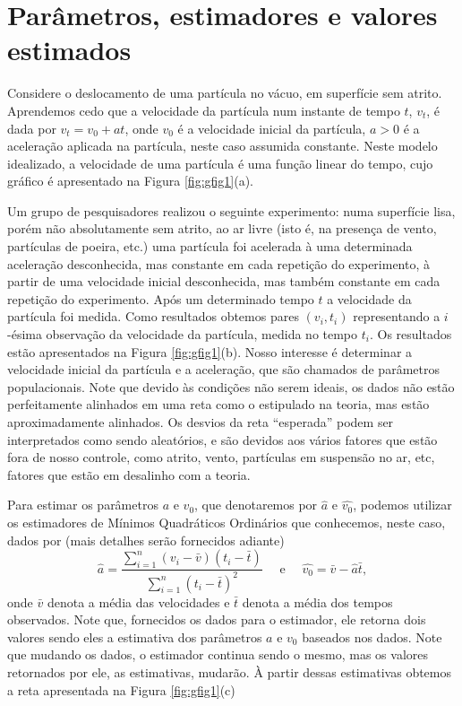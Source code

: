 \documentclass[
]{book}
\theoremstyle{definition}
\theoremstyle{definition}
\theoremstyle{definition}
\theoremstyle{remark}
\begin{document}
\hypertarget{paruxe2metros-estimadores-e-valores-estimados}{%
\section{Parâmetros, estimadores e valores estimados}\label{paruxe2metros-estimadores-e-valores-estimados}}

Considere o deslocamento de uma partícula no vácuo, em superfície sem atrito. Aprendemos cedo que a velocidade da partícula num instante de tempo \(t\), \(v_t\), é dada por \(v_t=v_0+at\), onde \(v_0\) é a velocidade inicial da partícula, \(a>0\) é a aceleração aplicada na partícula, neste caso assumida constante. Neste modelo idealizado, a velocidade de uma partícula é uma função linear do tempo, cujo gráfico é apresentado na Figura \ref{fig:gfig1}(a).

Um grupo de pesquisadores realizou o seguinte experimento: numa superfície lisa, porém não absolutamente sem atrito, ao ar livre (isto é, na presença de vento, partículas de poeira, etc.) uma partícula foi acelerada à uma determinada aceleração desconhecida, mas constante em cada repetição do experimento, à partir de uma velocidade inicial desconhecida, mas também constante em cada repetição do experimento. Após um determinado tempo \(t\) a velocidade da partícula foi medida. Como resultados obtemos pares \((v_i,t_i)\) representando a \(i\)-ésima observação da velocidade da partícula, medida no tempo \(t_i\). Os resultados estão apresentados na Figura \ref{fig:gfig1}(b). Nosso interesse é determinar a velocidade inicial da partícula e a aceleração, que são chamados de parâmetros populacionais. Note que devido às condições não serem ideais, os dados não estão perfeitamente alinhados em uma reta como o estipulado na teoria, mas estão aproximadamente alinhados. Os desvios da reta ``esperada'' podem ser interpretados como sendo aleatórios, e são devidos aos vários fatores que estão fora de nosso controle, como atrito, vento, partículas em suspensão no ar, etc, fatores que estão em desalinho com a teoria.

Para estimar os parâmetros \(a\) e \(v_0\), que denotaremos por \(\hat{a}\) e \(\hat{v_0}\), podemos utilizar os estimadores de Mínimos Quadráticos Ordinários que conhecemos, neste caso, dados por (mais detalhes serão fornecidos adiante)
\[\hat a=\frac{\sum_{i=1}^n(v_i-\bar v)(t_i-\bar t)}{\sum_{i=1}^n(t_i-\bar t)^2} \quad\mbox{ e }\quad \hat{v_0}=\bar{v}-\hat{a}\bar{t},\]
onde \(\bar{v}\) denota a média das velocidades e \(\bar{t}\) denota a média dos tempos observados. Note que, fornecidos os dados para o estimador, ele retorna dois valores sendo eles a estimativa dos parâmetros \(a\) e \(v_0\) baseados nos dados. Note que mudando os dados, o estimador continua sendo o mesmo, mas os valores retornados por ele, as estimativas, mudarão. À partir dessas estimativas obtemos a reta apresentada na Figura \ref{fig:gfig1}(c)
\end{document}
